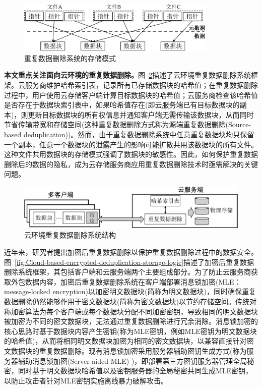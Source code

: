 \begin{figure}[!htb]
    \small
    \centering
    \includegraphics[width=0.85\textwidth]{pic/background/dedupOverview.pdf}
    \caption{重复数据删除系统的存储模式}
    \label{fig:Deduplication-storage-pattern}
\end{figure}

\textbf{本文重点关注面向云环境的重复数据删除。}图~\ref{fig:Cloud-based-deduplication-storage-logic}描述了云环境重复数据删除系统框架。云服务商维护哈希索引表，记录所有已存储数据块的哈希值；在重复数据删除过程中，用户使用云存储客户端计算目标数据块的哈希值；云服务商检查该哈希值是否存在于数据块索引表中，如果哈希值存在(即云服务端已有目标数据块的副本)，则更新目标数据块的所有权信息并通知客户端无需传输该数据块，从而同时节省传输带宽和存储空间(这种重复数据删除方式称为源端重复数据删除(Source-based deduplication))。然而，由于重复数据删除系统中任意重复数据块均只保留一个副本，任意一个数据块的泄露产生的影响可能扩散共用该数据块的所有文件。这种文件共用数据块的存储模式强调了数据块的敏感性。因此，如何保护重复数据删除后的数据的隐私，成为云存储服务商应用重复数据删除技术时亟需解决的关键问题。

\begin{figure}[!htb]
    \small
    \centering
    \includegraphics[width=\textwidth]{pic/background/Cloud-deduplication.pdf}
    \caption{云环境重复数据删除系统结构}
    \label{fig:Cloud-based-deduplication-storage-logic}
\end{figure}
近年来，研究者提出加密后重复数据删除\cite{bellare2013MLE}以保护重复数据删除过程中的数据安全。图~\ref{fig:Cloud-based-encrypted-deduplication-storage-logic}描述了加密后重复数据删除系统框架，其包括客户端和云服务端两个主要组成部分。为了防止云服务商获取外包数据内容，加密后重复数据删除系统在客户端部署消息锁加密(MLE：message-locked encryption)\cite{bellare2013MLE}以加密明文数据块(简称为明文数据块)，同时确保重复数据删除仍然能够作用于密文数据块(简称为密文数据块)以节约存储空间。传统对称加密算法为每个客户端或每个数据块分配不同加密密钥，导致相同的明文数据块被加密为不同的密文数据块，无法通过重复数据删除进行冗余消除。消息锁加密的核心思路时基于数据块内容产生密钥(称为MLE密钥，例如MLE密钥为明文数据块的哈希值\cite{douceur2002reclaiming})，从而将相同明文数据块加密为相同的密文数据块，以兼容直接针对密文数据块的重复数据删除。现有消息锁加密采用服务器辅助密钥生成方式(称为服务器辅助消息锁加密(Server-aided MLE)
\cite{bellare2013DupLESS})，即部署第三方密钥服务器管理全局秘密，同时基于明文数据块哈希值以及密钥服务器的全局秘密共同生成MLE密钥，以防止攻击者针对MLE密钥实施离线暴力破解攻击。

